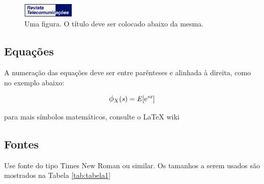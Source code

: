 \begin{figure}[H]
  \centering
  \includegraphics[width=0.22\textwidth]{figuras/figura1.png}
  \caption{Uma figura. O título deve ser colocado abaixo da mesma.}
  \label{fig:revista_inatel}
\end{figure}

\subsection{Equações}
A numeração das equações deve ser entre parênteses e alinhada à direita, como no exemplo abaixo:

\begin{equation}
\mathbf{\mathit{\mathlarger{\phi}_{X}(s) = E[\mathrm{e}^{sx}]}}
\end{equation}

para mais símbolos matemáticos, consulte o LaTeX wiki%

\subsection{Fontes}

Use fonte do tipo Times New Roman ou similar. Os tamanhos a serem usados são mostrados na Tabela \ref{tab:tabela1}


